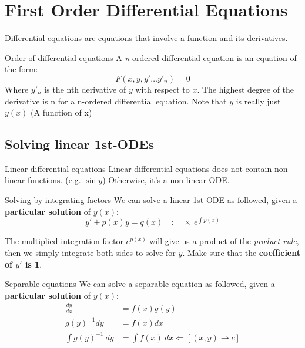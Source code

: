 \documentclass{article}
\begin{document}
\section{First Order Differential Equations}
Differential equations are equations that involve a function and its derivatives.
\begin{definition}
    {Order of differential equations}
    A \emph{n} ordered differential equation is an equation of the form:
    \[F(x,y,y'\dots y'_n)=0\]
    Where $y'_n$ is the nth derivative of $y$ with respect to $x$. The highest degree of the derivative is n for a n-ordered differential equation. Note that $y$ is really just $y(x)$ (A function of x)
\end{definition}

\subsection{Solving linear 1st-ODEs}
\begin{definition}
    {Linear differential equations}
    Linear differential equations does not contain non-linear functions. (e.g. $\sin y$) Otherwise, it's a non-linear ODE.
\end{definition}
\begin{theorem}
    {Solving by integrating factors}
    We can solve a linear 1st-ODE as followed, given a \textbf{particular solution} of $y(x)$:
    \[y'+p(x)y=q(x)\quad : \quad\times\ e^{\int p(x)}\]

    The multiplied integration factor $e^{p(x)}$ will give us a product of the \emph{product rule}, then we simply integrate both sides to solve for $y$. Make sure that the \textbf{coefficient of $y'$ is 1}.
\end{theorem}

\begin{theorem}
    {Separable equations}
    We can solve a separable equation as followed, given a \textbf{particular solution} of $y(x)$:
    \begin{align*}
        \frac{dy}{dx}       & =f(x)g(y)                              \\
        {g(y)}^{-1}dy       & =f(x)dx                                \\
        \int{g(y)}^{-1}\:dy & =\int f(x)\:dx \Leftarrow [(x,y)\to c]
    \end{align*}
\end{theorem}
\end{document}
